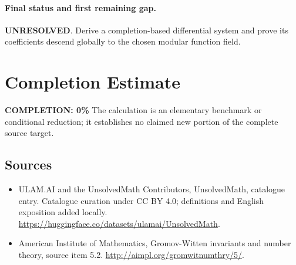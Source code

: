 \documentclass[11pt]{article}
\begin{document}
\paragraph{Final status and first remaining gap.}
\textbf{UNRESOLVED}. Derive a completion-based differential system and prove its coefficients descend globally to the chosen modular function field.

\section{Completion Estimate}
\noindent\textbf{COMPLETION: 0\%}
The calculation is an elementary benchmark or conditional reduction; it establishes no claimed new portion of the complete source target.

\subsection{Sources}
\begin{itemize}
\item[\hypertarget{source:statement:1}{S1}] ULAM.AI and the UnsolvedMath Contributors, UnsolvedMath, catalogue entry. Catalogue curation under CC BY 4.0; definitions and English exposition added locally.
\url{https://huggingface.co/datasets/ulamai/UnsolvedMath}.
\item[\hypertarget{source:statement:2}{S2}] American Institute of Mathematics, Gromov-Witten invariants and number theory, source item 5.2.
\url{http://aimpl.org/gromwitnumthry/5/}.
\end{itemize}
\label{end:statement}
\end{document}
